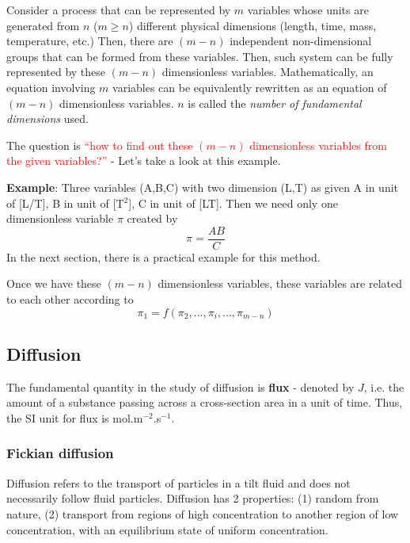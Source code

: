 Consider a process that can be represented by $m$ variables whose
units are generated from $n$ ($m\ge n$) different physical dimensions
(length, time, mass, temperature, etc.)  Then, there are $(m-n)$
independent non-dimensional groups that can be formed from these
variables. Then, such system can be fully represented by these $(m-n)$
dimensionless variables. Mathematically, an equation involving $m$
variables can be equivalently rewritten as an equation of $(m-n)$
dimensionless variables. $n$ is called the
{\it number of fundamental dimensions} used.

The question is
\textcolor{red}{``how to find out these $(m-n)$ dimensionless
  variables from the given variables?''}
- Let's take a look at this example.

{\bf Example}: Three variables (A,B,C) with two dimension (L,T) as
given A in unit of [L/T], B in unit of [T$^2$], C in unit of
[LT]. Then we need only one dimensionless variable $\pi$ created by
\begin{equation}
  \label{eq:190}
  \pi = \frac{AB}{C}
\end{equation}
In the next section, there is a practical example for this method.

Once we have these $(m-n)$ dimensionless variables, these variables
are related to each other according to
\begin{equation}
  \label{eq:175}
  \pi_1 = f(\pi_2, ...,\pi_i,...,\pi_{m-n})
\end{equation}



\subsection{Diffusion}
\label{sec:diffusion}

The fundamental quantity in the study of diffusion is {\bf flux} -
denoted by $J$, i.e. the amount of a substance passing across a
cross-section area in a unit of time. Thus, the SI unit for flux is
mol.m$^{-2}$.s$^{-1}$.

\subsubsection{Fickian diffusion}
\label{sec:fickian-diffusion}


Diffusion refers to the transport of particles in a tilt fluid and
does not necessarily follow fluid particles. Diffusion has 2
properties: (1) random from nature, (2) transport from regions of high
concentration to another region of low concentration, with an
equilibrium state of uniform concentration.


